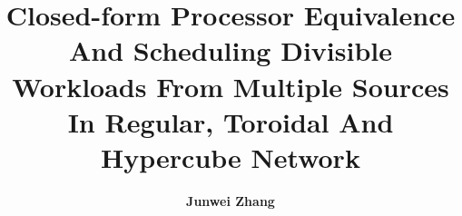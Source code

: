 \dissertation

\title{Closed-form Processor Equivalence And Scheduling Divisible Workloads From Multiple Sources In Regular, Toroidal And Hypercube Network}
\author{{\bf Junwei Zhang}}

\maketitle

\begin{approval}
\end{approval}
 
\begin{spacing}{\doublespace}
\begin{abstract}

\end{abstract}
 
\begin{dedication}

\end{dedication}
 
\tableofcontents
\listoffigures
\listoftables
\end{spacing}

\begin{spacing}{}
\begin{acknowledgements}

\end{acknowledgements}
\end{spacing}

